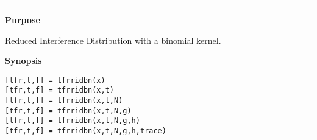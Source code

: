 

\hspace*{-1.6cm}{\Large \bf tfrridbn}

\vspace*{-.4cm}
\hspace*{-1.6cm}\rule[0in]{16.5cm}{.02cm}
\vspace*{.2cm}

{\bf \large {}\selectfont Purpose}\\
\hspace*{1.5cm}
\begin{minipage}[t]{13.5cm}
Reduced Interference Distribution with a binomial kernel.
\end{minipage}
\vspace*{.2cm}

{\bf \large {}\selectfont Synopsis}\\
\hspace*{1.5cm}
\begin{minipage}[t]{13.5cm}
\begin{verbatim}
[tfr,t,f] = tfrridbn(x)
[tfr,t,f] = tfrridbn(x,t)
[tfr,t,f] = tfrridbn(x,t,N)
[tfr,t,f] = tfrridbn(x,t,N,g)
[tfr,t,f] = tfrridbn(x,t,N,g,h)
[tfr,t,f] = tfrridbn(x,t,N,g,h,trace)
\end{verbatim}
\end{minipage}
\vspace*{.5cm}

